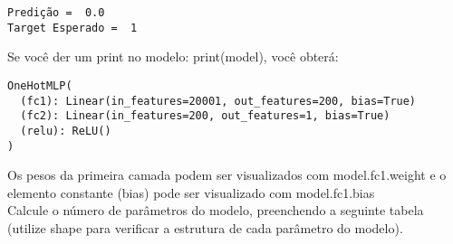 \documentclass[11pt]{article}
\begin{document}
    \begin{Verbatim}[commandchars=\\\{\}]
Predição =  0.0
Target Esperado =  1
    \end{Verbatim}

    Se você der um print no modelo: print(model), você obterá:

\begin{verbatim}
OneHotMLP(
  (fc1): Linear(in_features=20001, out_features=200, bias=True)  
  (fc2): Linear(in_features=200, out_features=1, bias=True)  
  (relu): ReLU()
)
\end{verbatim}

Os pesos da primeira camada podem ser visualizados com model.fc1.weight
e o elemento constante (bias) pode ser visualizado com model.fc1.bias\\
Calcule o número de parâmetros do modelo, preenchendo a seguinte tabela
(utilize shape para verificar a estrutura de cada parâmetro do modelo).
\end{document}
